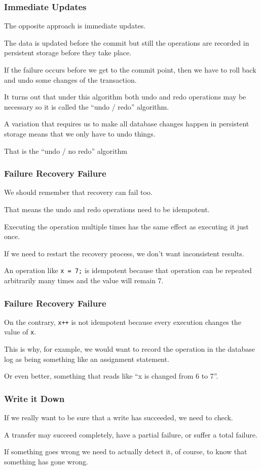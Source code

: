 \begin{frame}
\frametitle{Immediate Updates}

The opposite approach is \alert{immediate updates}. 

The data is updated before the commit but still the operations are recorded in persistent storage before they take place. 

If the failure occurs before we get to the commit point, then we have to roll back and undo some changes of the transaction. 

It turns out that under this algorithm both undo and redo operations may be necessary so it is called the ``undo / redo'' algorithm. 

A variation that requires us to make all database changes happen in persistent storage means that we only have to undo things.

That is the ``undo / no redo'' algorithm


\end{frame}


\begin{frame}
\frametitle{Failure Recovery Failure}

We should remember that recovery can fail too. 

That means the undo and redo operations need to be \alert{idempotent}.

Executing the operation multiple times has the same effect as executing it just once. 

If we need to restart the recovery process, we don't want inconsistent results. 

An operation like \texttt{x = 7;} is idempotent because that operation can be repeated arbitrarily many times and the value will remain 7.


\end{frame}

\begin{frame}
\frametitle{Failure Recovery Failure}

On the contrary, \texttt{x++} is not idempotent because every execution changes the value of \texttt{x}.

 This is why, for example, we would want to record the operation in the database log as being something like an assignment statement. 
 
 Or even better, something that reads like ``x is changed from 6 to 7''.

\end{frame}

\begin{frame}
\frametitle{Write it Down}

If we really want to be sure that a write has succeeded, we need to check. 

A transfer may succeed completely, have a partial failure, or suffer a total failure. 

If something goes wrong we need to actually detect it, of course, to know that something has gone wrong. 

\end{frame}


